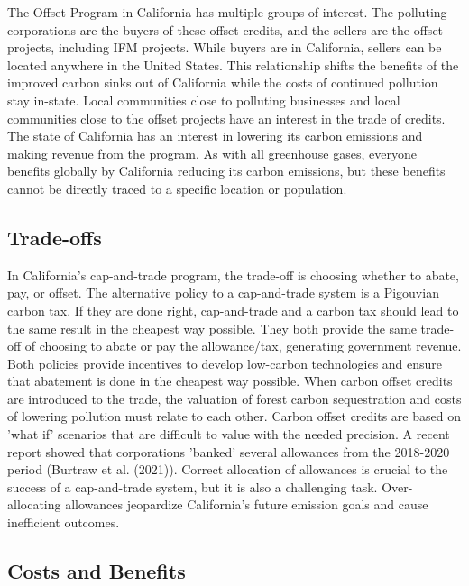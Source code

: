 \documentclass[11pt]{article}
\begin{document}
The Offset Program in California has multiple groups of interest. The polluting corporations are the buyers of these offset credits, and the sellers are the offset projects, including IFM projects. While buyers are in California, sellers can be located anywhere in the United States. This relationship shifts the benefits of the improved carbon sinks out of California while the costs of continued pollution stay in-state. Local communities close to polluting businesses and local communities close to the offset projects have an interest in the trade of credits. The state of California has an interest in lowering its carbon emissions and making revenue from the program. As with all greenhouse gases, everyone benefits globally by California reducing its carbon emissions, but these benefits cannot be directly traced to a specific location or population.

\subsection*{Trade-offs}

In California's cap-and-trade program, the trade-off is choosing whether to abate, pay, or offset. The alternative policy to a cap-and-trade system is a Pigouvian carbon tax. If they are done right, cap-and-trade and a carbon tax should lead to the same result in the cheapest way possible. They both provide the same trade-off of choosing to abate or pay the allowance/tax, generating government revenue. Both policies provide incentives to develop low-carbon technologies and ensure that abatement is done in the cheapest way possible. When carbon offset credits are introduced to the trade, the valuation of forest carbon sequestration and costs of lowering pollution must relate to each other. Carbon offset credits are based on 'what if' scenarios that are difficult to value with the needed precision. A recent report showed that corporations 'banked' several allowances from the 2018-2020 period (Burtraw et al. (2021)). Correct allocation of allowances is crucial to the success of a cap-and-trade system, but it is also a challenging task. Over-allocating allowances jeopardize California's future emission goals and cause inefficient outcomes.

\subsection*{Costs and Benefits}
\end{document}
